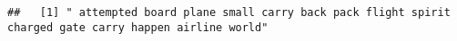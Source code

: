 \documentclass[
]{article}
\begin{document}
\begin{verbatim}
##   [1] " attempted board plane small carry back pack flight spirit charged gate carry happen airline world"                                                                                                                                                                                                                                                                                                                                                                                                                                                                                                                                                                                                                                                                                                                                                                                                                                                                                                                                                                                                                                                                                                                                                                                                                                                                                                                                                                                                                                                                                                                                                                                                                                                                                            

\end{verbatim}
\end{document}

